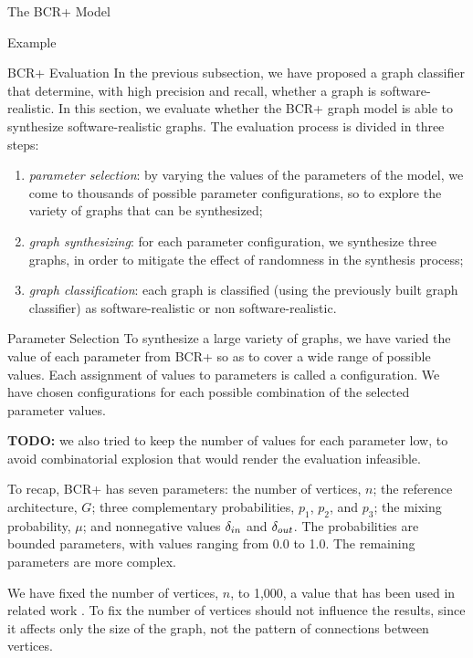 \documentclass[11pt,twocolumn,a4paper,english]{article}
\newcommand{\TODO}{\textbf{TODO:} }
\begin{document}
\begin{section}{The BCR+ Model}
\begin{subsection}{Example}
\end{subsection}
	
\begin{subsection}{BCR+ Evaluation}
	In the previous subsection, we have proposed a graph classifier that determine, with high precision and recall, whether a graph is software-realistic. In this section, we evaluate whether the BCR+ graph model is able to synthesize software-realistic graphs. The evaluation process is divided in three steps:
	
	\begin{enumerate}
		\item \emph{parameter selection}: by varying the values of the parameters of the model, we come to thousands of possible parameter configurations, so to explore the variety of graphs that can be synthesized;
		
		\item \emph{graph synthesizing}: for each parameter configuration, we synthesize three graphs, in order to mitigate the effect of randomness in the synthesis process;
		
		\item \emph{graph classification}: each graph is classified (using the previously built graph classifier) as software-realistic or non software-realistic.
	\end{enumerate}
	
\begin{subsubsection}{Parameter Selection}
	To synthesize a large variety of graphs, we have varied the value of each parameter from BCR+ so as to cover a wide range of possible values. Each assignment of values to parameters is called a configuration. We have chosen configurations for each possible combination of the selected parameter values.
	
	\TODO we also tried to keep the number of values for each parameter low, to avoid combinatorial explosion that would render the evaluation infeasible. 
	
	To recap, BCR+ has seven parameters: the number of vertices, $n$; the reference architecture, $G$; three complementary probabilities, $p_1$, $p_2$, and $p_3$; the mixing probability, $\mu$; and nonnegative values $\delta_{in}$ and $\delta_{out}$. The probabilities are bounded parameters, with values ranging from 0.0 to 1.0. The remaining parameters are more complex.
	
	We have fixed the number of vertices, $n$, to 1,000, a value that has been used in related work \cite{Lancichinetti2009b}. To fix the number of vertices should not influence the results, since it affects only the size of the graph, not the pattern of connections between vertices.
	

\end{subsubsection}
\end{subsection}
\end{section}
\end{document}
